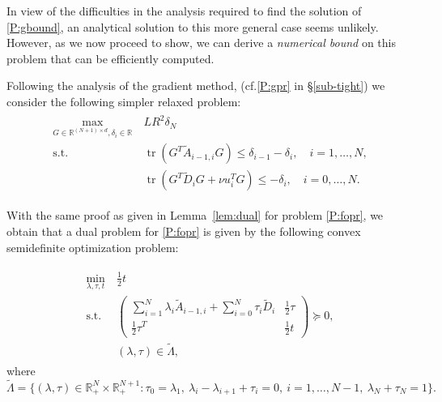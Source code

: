 \documentclass[12pt]{article}
\numberwithin{equation}{section}
\theoremstyle{definition}
\theoremstyle{remark}
\DeclareMathOperator{\trace}{tr}
\def\real{\mathbb{R}}
\begin{document}
In view of the difficulties in the analysis required to find the solution of \eqref{P:gbound},
an analytical solution to this more general case seems unlikely. However, as we now proceed to
show, we can derive a {\em numerical bound} on this problem that can be efficiently computed.


Following  the analysis of the gradient method, (cf.\eqref{P:gpr} in \S\ref{sub-tight}) we consider the
following simpler relaxed problem:
\begin{align*}
    \begin{aligned}
    \max_{G\in \mathbb{R}^{(N+1)\times d},\delta_i \in\mathbb{R}}\ &  LR^2 \delta_N \\
    \text{s.t. }
                        & \trace (G^T \tilde{A}_{i-1,i} G) \leq \delta_{i-1} - \delta_i,\quad    i=1,\dots,N, \\
                        & \trace(G^T \tilde{D}_i G+ \nu u_i^T G ) \leq - \delta_i,\quad     i=0,\dots,N.
    \end{aligned}
    \tag{Q$^\prime$}\label{P:fopr}
\end{align*}

With the same proof as given in Lemma~\ref{lem:dual}  for problem \eqref{P:fopr}, we obtain that a dual
problem for \eqref{P:fopr} is given by the following convex semidefinite optimization problem:


\begin{align*}
    \begin{aligned}
    \min_{\lambda, \tau,t}\ & \frac{1}{2} t \\
    \text{s.t. }
            & \begin{pmatrix}
                \sum_{i=1}^N \lambda_i  \tilde{A}_{i-1,i}  + \sum_{i=0}^N \tau_i  \tilde{D}_i  &\frac{1}{2} \tau \\
                \frac{1}{2} \tau^T      & \frac{1}{2} t
        \end{pmatrix} \succeq 0, \\
        & (\lambda, \tau) \in \tilde{\Lambda},
    \end{aligned}
    \tag{DQ$^\prime$}\label{P:foprd}
\end{align*}
where
\begin{equation}\label{E:duallinearconstraints}
    \tilde{\Lambda} = \{ (\lambda,\tau) \in \real^{N}_{+}\times \real^{N+1}_{+} :
         \tau_0 = \lambda_1, \
        \lambda_i-\lambda_{i+1}+\tau_i = 0, \  i=1,\dots,N-1,\
        \lambda_N+\tau_N=1
    \}.
\end{equation}
\end{document}
